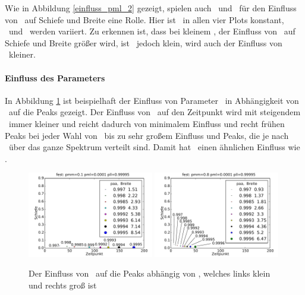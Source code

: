 Wie in Abbildung \ref{einfluss_pml_2} gezeigt, spielen auch \pmm\ und \paa\ für den Einfluss von \pml\ auf Schiefe und Breite eine Rolle. Hier ist \pll\ in allen vier Plots konstant, \pmm\ und \paa\ werden variiert. Zu erkennen ist, dass bei kleinem \paa, der Einfluss von \pml\ auf Schiefe und Breite größer wird, ist \pmm\ jedoch klein, wird auch der Einfluss von \pml\ kleiner.

\clearpage

\paragraph*{Einfluss des Parameters \paa}

In Abbildung \ref{einfluss_paa} ist beispielhaft der Einfluss von Parameter \paa\ in Abhängigkeit von \pmm\ auf die Peaks gezeigt. Der Einfluss von \paa\ auf den Zeitpunkt wird mit steigendem \pmm\ immer kleiner und reicht dadurch von minimalem Einfluss und recht frühen Peaks bei jeder Wahl von \paa\ bis zu sehr großem Einfluss und Peaks, die je nach \paa\ über das ganze Spektrum verteilt sind. Damit hat \paa\ einen ähnlichen Einfluss wie \pmm.
\begin{figure}[]
\includegraphics[width=0.49\textwidth]{bilder/paa/3fest_01_00001_p_099995}
\includegraphics[width=0.49\textwidth]{bilder/paa/3fest_08_00001_p_099995}
\caption[Der Einfluss von \paa\ auf die Peaks abhängig von \pmm]{Der Einfluss von \paa\ auf die Peaks abhängig von \pmm, welches links klein und rechts groß ist}
\label{einfluss_paa}
\end{figure}



